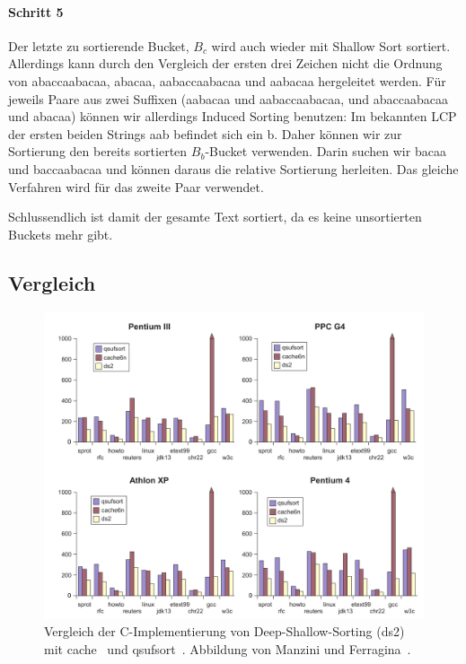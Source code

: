 \paragraph{Schritt 5} Der letzte zu sortierende Bucket, $B_c$ wird auch wieder mit Shallow Sort sortiert.
Allerdings kann durch den Vergleich der ersten drei Zeichen nicht die Ordnung von \glqq abaccaabacaa\grqq, \glqq abacaa\grqq, \glqq aabaccaabacaa\grqq{} und \glqq aabacaa\grqq{} hergeleitet werden.
Für jeweils Paare aus zwei Suffixen (\glqq aabacaa\grqq{} und \glqq aabaccaabacaa\grqq, und \glqq abaccaabacaa\grqq{} und abacaa) können wir allerdings Induced Sorting benutzen:
Im bekannten LCP der ersten beiden Strings \glqq aab\grqq{} befindet sich ein \glqq b\grqq.
Daher können wir zur Sortierung den bereits sortierten $B_b$-Bucket verwenden.
Darin suchen wir \glqq bacaa\grqq{} und \glqq baccaabacaa\grqq{} und können daraus die relative Sortierung herleiten.
Das gleiche Verfahren wird für das zweite Paar verwendet.

Schlussendlich ist damit der gesamte Text sortiert, da es keine unsortierten Buckets mehr gibt.

\subsection{Vergleich}
\begin{figure}[!h]
\centering
\includegraphics[width=\textwidth]{kapitel/saca_algorithmen/ds/graph.png}
\caption{Vergleich der C-Implementierung von Deep-Shallow-Sorting (ds2) mit cache~\cite{seward2000} und qsufsort~\cite{saca:1}. Abbildung von Manzini und Ferragina~\cite{saca:4}.}
\label{fg:graph}
\end{figure}

